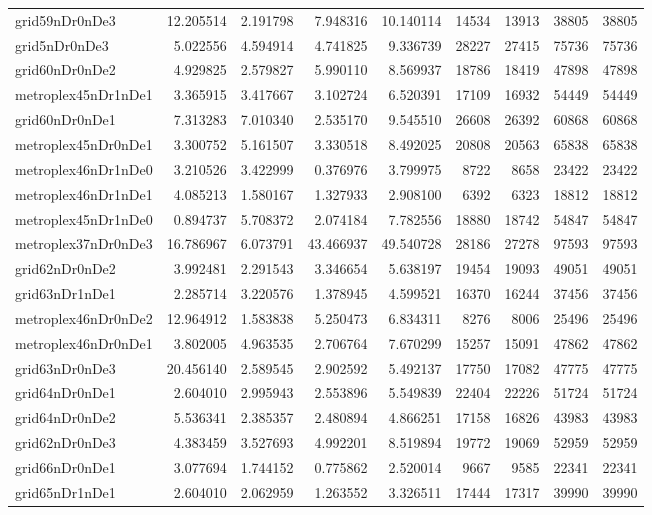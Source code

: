 \begin{longtable}{|l|r|r|r|r|r|r|r|r|}
grid59nDr0nDe3 & 12.205514 & 2.191798 & 7.948316 & 10.140114 & 14534 & 13913 & 38805 & 38805 \\
grid5nDr0nDe3 & 5.022556 & 4.594914 & 4.741825 & 9.336739 & 28227 & 27415 & 75736 & 75736 \\
grid60nDr0nDe2 & 4.929825 & 2.579827 & 5.990110 & 8.569937 & 18786 & 18419 & 47898 & 47898 \\
metroplex45nDr1nDe1 & 3.365915 & 3.417667 & 3.102724 & 6.520391 & 17109 & 16932 & 54449 & 54449 \\
grid60nDr0nDe1 & 7.313283 & 7.010340 & 2.535170 & 9.545510 & 26608 & 26392 & 60868 & 60868 \\
metroplex45nDr0nDe1 & 3.300752 & 5.161507 & 3.330518 & 8.492025 & 20808 & 20563 & 65838 & 65838 \\
metroplex46nDr1nDe0 & 3.210526 & 3.422999 & 0.376976 & 3.799975 & 8722 & 8658 & 23422 & 23422 \\
metroplex46nDr1nDe1 & 4.085213 & 1.580167 & 1.327933 & 2.908100 & 6392 & 6323 & 18812 & 18812 \\
metroplex45nDr1nDe0 & 0.894737 & 5.708372 & 2.074184 & 7.782556 & 18880 & 18742 & 54847 & 54847 \\
metroplex37nDr0nDe3 & 16.786967 & 6.073791 & 43.466937 & 49.540728 & 28186 & 27278 & 97593 & 97593 \\
grid62nDr0nDe2 & 3.992481 & 2.291543 & 3.346654 & 5.638197 & 19454 & 19093 & 49051 & 49051 \\
grid63nDr1nDe1 & 2.285714 & 3.220576 & 1.378945 & 4.599521 & 16370 & 16244 & 37456 & 37456 \\
metroplex46nDr0nDe2 & 12.964912 & 1.583838 & 5.250473 & 6.834311 & 8276 & 8006 & 25496 & 25496 \\
metroplex46nDr0nDe1 & 3.802005 & 4.963535 & 2.706764 & 7.670299 & 15257 & 15091 & 47862 & 47862 \\
grid63nDr0nDe3 & 20.456140 & 2.589545 & 2.902592 & 5.492137 & 17750 & 17082 & 47775 & 47775 \\
grid64nDr0nDe1 & 2.604010 & 2.995943 & 2.553896 & 5.549839 & 22404 & 22226 & 51724 & 51724 \\
grid64nDr0nDe2 & 5.536341 & 2.385357 & 2.480894 & 4.866251 & 17158 & 16826 & 43983 & 43983 \\
grid62nDr0nDe3 & 4.383459 & 3.527693 & 4.992201 & 8.519894 & 19772 & 19069 & 52959 & 52959 \\
grid66nDr0nDe1 & 3.077694 & 1.744152 & 0.775862 & 2.520014 & 9667 & 9585 & 22341 & 22341 \\
grid65nDr1nDe1 & 2.604010 & 2.062959 & 1.263552 & 3.326511 & 17444 & 17317 & 39990 & 39990 \\

\end{longtable}
